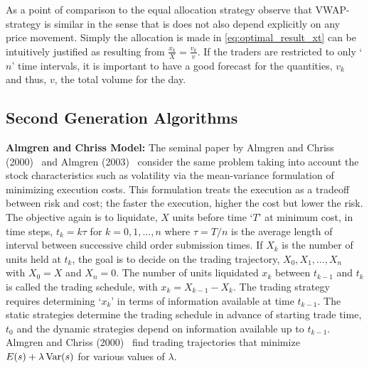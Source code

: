 As a point of comparison to the equal allocation strategy observe that VWAP-strategy is similar in the sense that is does not also depend explicitly on any price movement. Simply the allocation is made in \eqref{eq:optimal_result_xt} can be intuitively justified as resulting from $\frac{x_k}{X}= \frac{v_k}{v}$. If the traders are restricted to only `$n$' time intervals, it is important to have a good forecast for the quantities, $v_k$ and thus, $v$, the total volume for the day. 


\subsection{Second Generation Algorithms \label{subsec:almchrmodel}}

\noindent\textbf{Almgren and Chriss Model:} The seminal paper by Almgren and Chriss (2000)~\cite{alm2000} and Almgren (2003)~\cite{almgren2003} consider the same problem taking into account the stock characteristics such as volatility via the mean-variance formulation of minimizing execution costs. This formulation treats the execution as a tradeoff between risk and cost; the faster the execution, higher the cost but lower the risk. The objective again is to liquidate, $X$ units before time `$T$' at minimum cost, in time steps, $t_k = k \tau$ for $k = 0,1,\ldots, n$ where $\tau = T/n$ is the average length of interval between successive child order submission times. If $X_k$ is the number of units held at $t_k$, the goal is to decide on the trading trajectory, $X_0, X_1, \ldots, X_n$ with $X_0=X$ and $X_n=0$. The number of units liquidated $x_k$ between $t_{k-1}$ and $t_k$ is called the trading schedule, with $x_k = X_{k-1} - X_k$. The trading strategy requires determining `$x_k$' in terms of information available at time $t_{k-1}$. The static strategies determine the trading schedule in advance of starting trade time, $t_0$ and the dynamic strategies depend on information available up to $t_{k-1}$. Almgren and Chriss (2000)~\cite{alm2000} find trading trajectories that minimize $E(s)+\lambda \operatorname{Var}(s)$ for various values of $\lambda$.


